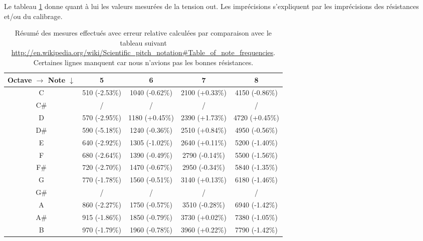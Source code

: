 Le tableau \ref{tab:keyboard-measure-vs-theory} donne quant
à lui les valeurs mesurées de la tension out. Les imprécisions
s'expliquent par les imprécisions des résistances et/ou du
calibrage.

\begin{table}[ht]
	\centering
		\begin{tabular}{|c|c|c|c|c|}
			\hline
				\specialcell{Octave $\rightarrow$ \\ Note $\downarrow$} & 5 & 6 & 7 & 8 \\
			\hline
				 C & \unit{510}{\milli\volt} (-2.53\%) & \unit{1040}{\milli\volt} (-0.62\%) & \unit{2100}{\milli\volt} (+0.33\%) & \unit{4150}{\milli\volt} (-0.86\%) \\
			\hline
				 C\# & / & / & / & / \\
			\hline
				 D &  \unit{570}{\milli\volt} (-2.95\%) & \unit{1180}{\milli\volt} (+0.45\%) & \unit{2390}{\milli\volt} (+1.73\%) & \unit{4720}{\milli\volt} (+0.45\%) \\
			\hline
				 D\# & \unit{590}{\milli\volt} (-5.18\%) & \unit{1240}{\milli\volt} (-0.36\%) & \unit{2510}{\milli\volt} (+0.84\%) & \unit{4950}{\milli\volt} (-0.56\%) \\
			\hline
				 E & \unit{640}{\milli\volt} (-2.92\%) & \unit{1305}{\milli\volt} (-1.02\%) & \unit{2640}{\milli\volt} (+0.11\%) & \unit{5200}{\milli\volt} (-1.40\%) \\
			\hline
				 F & \unit{680}{\milli\volt} (-2.64\%) & \unit{1390}{\milli\volt} (-0.49\%) & \unit{2790}{\milli\volt} (-0.14\%) & \unit{5500}{\milli\volt} (-1.56\%) \\
			\hline
				 F\# & \unit{720}{\milli\volt} (-2.70\%) & \unit{1470}{\milli\volt} (-0.67\%) & \unit{2950}{\milli\volt} (-0.34\%) & \unit{5840}{\milli\volt} (-1.35\%) \\
			\hline
				 G & \unit{770}{\milli\volt} (-1.78\%) & \unit{1560}{\milli\volt} (-0.51\%) & \unit{3140}{\milli\volt} (+0.13\%) & \unit{6180}{\milli\volt} (-1.46\%) \\
			\hline
				 G\# & / & / & / & / \\
			\hline
				 A & \unit{860}{\milli\volt} (-2.27\%) & \unit{1750}{\milli\volt} (-0.57\%) & \unit{3510}{\milli\volt} (-0.28\%) & \unit{6940}{\milli\volt} (-1.42\%) \\
			\hline
				 A\# & \unit{915}{\milli\volt} (-1.86\%) & \unit{1850}{\milli\volt} (-0.79\%) & \unit{3730}{\milli\volt} (+0.02\%) & \unit{7380}{\milli\volt} (-1.05\%) \\
			\hline
				 B & \unit{970}{\milli\volt} (-1.79\%) & \unit{1960}{\milli\volt} (-0.78\%) & \unit{3960}{\milli\volt} (+0.22\%) & \unit{7790}{\milli\volt} (-1.42\%) \\
			\hline
		\end{tabular}
	\caption{Résumé des mesures effectués avec erreur relative calculées par comparaison avec
	le tableau suivant \url{http://en.wikipedia.org/wiki/Scientific_pitch_notation\#Table_of_note_frequencies}. 
	Certaines lignes manquent car nous n'avions pas les bonnes résistances.}
	\label{tab:keyboard-measure-vs-theory}
\end{table}

